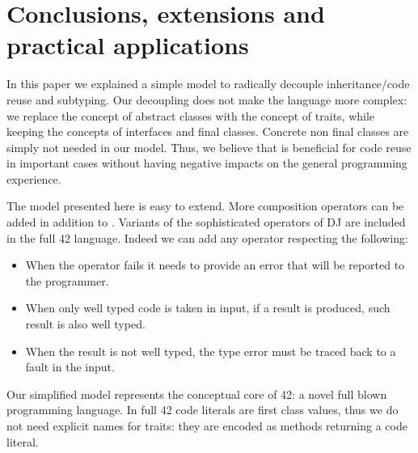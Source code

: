 
\section{Conclusions, extensions and practical applications}

In this paper we explained a simple model to 
radically decouple inheritance/code reuse and subtyping.
Our decoupling does not
make the language more complex:
we replace the concept of abstract classes with
the concept of traits, while keeping the concepts of
interfaces and final classes.
Concrete non final classes are simply not needed in our model.
Thus, we believe that \name is beneficial for
code reuse in important cases 
without having negative impacts on the general programming experience.

The model presented here is easy to extend.
More composition operators can be added in addition to \use.
Variants of the sophisticated operators of DJ are
included in the full 42 language.
 Indeed we can add any operator respecting the following:

\begin{itemize}
\item When the operator fails it needs to provide an error that will be reported to the programmer.
\item When only well typed code is taken in input, if a result is produced,
 such result is also well typed.
\item When the result is not well typed,
the type error must be traced back to
a fault in the input.
 \end{itemize}
 

Our simplified model represents the conceptual core of  42: a novel full blown programming language.
In full 42 code literals are first class values, thus we
do not need explicit names
for traits: they are encoded as methods
 returning a code literal.

\begin{comment}
using the ideas presented in this paper to obtain reliable and understandable metaprogramming.
Formalization (in progress) for full 42 can be found at
\url{http://}\footnote{Omitted for anonymous review}. 
42 extends our model allowing
flattening to execute arbitrary computations.
In such model we do not need an explicit notion of traits: they are encoded as methods returning a code literal.
42 also has features less related to code composition, like
  a strong type system supporting aliasing mutability and circularity control,
   checked exceptions, and errors (unchecked exceptions) with strong-exception-safety.


42 do not have a finite set of composition operators; they can be
added using the built in support for native method calls. They can
be dynamically checked to verify that they are well behaved
according to our predicate, or they can be trusted to achieve
efficiency.
\end{comment}

